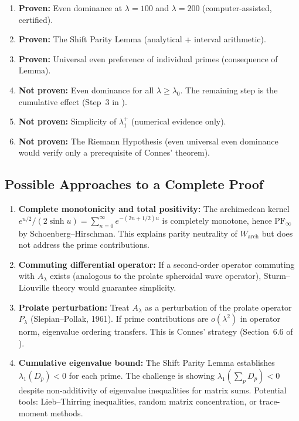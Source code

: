 \documentclass[12pt,a4paper]{article}
\theoremstyle{definition}
\theoremstyle{remark}
\begin{document}
\begin{enumerate}
  \item \textbf{Proven:} Even dominance at $\lambda = 100$ and $\lambda = 200$ (computer-assisted, certified).
  \item \textbf{Proven:} The Shift Parity Lemma (analytical + interval arithmetic).
  \item \textbf{Proven:} Universal even preference of individual primes (consequence of Lemma).
  \item \textbf{Not proven:} Even dominance for all $\lambda \geq \lambda_0$. The remaining step is the cumulative effect (Step~3 in ).
  \item \textbf{Not proven:} Simplicity of $\lambda_1^+$ (numerical evidence only).
  \item \textbf{Not proven:} The Riemann Hypothesis (even universal even dominance would verify only a prerequisite of Connes' theorem).
\end{enumerate}

\subsection{Possible Approaches to a Complete Proof}

\begin{enumerate}[label=(\Alph*)]
  \item \textbf{Complete monotonicity and total positivity:} The archimedean kernel $e^{u/2}/(2\sinh u) = \sum_{n=0}^\infty e^{-(2n+1/2)u}$ is completely monotone, hence $\mathrm{PF}_\infty$ by Schoenberg--Hirschman. This explains parity neutrality of $W_{\mathrm{arch}}$ but does not address the prime contributions.

  \item \textbf{Commuting differential operator:} If a second-order operator commuting with $A_\lambda$ exists (analogous to the prolate spheroidal wave operator), Sturm--Liouville theory would guarantee simplicity.

  \item \textbf{Prolate perturbation:} Treat $A_\lambda$ as a perturbation of the prolate operator $P_\lambda$ (Slepian--Pollak, 1961). If prime contributions are $o(\lambda^2)$ in operator norm, eigenvalue ordering transfers. This is Connes' strategy (Section~6.6 of \cite{Connes2025}).

  \item \textbf{Cumulative eigenvalue bound:} The Shift Parity Lemma establishes $\lambda_1(D_p) < 0$ for each prime. The challenge is showing $\lambda_1(\sum_p D_p) < 0$ despite non-additivity of eigenvalue inequalities for matrix sums. Potential tools: Lieb--Thirring inequalities, random matrix concentration, or trace-moment methods.
\end{enumerate}
\end{document}
